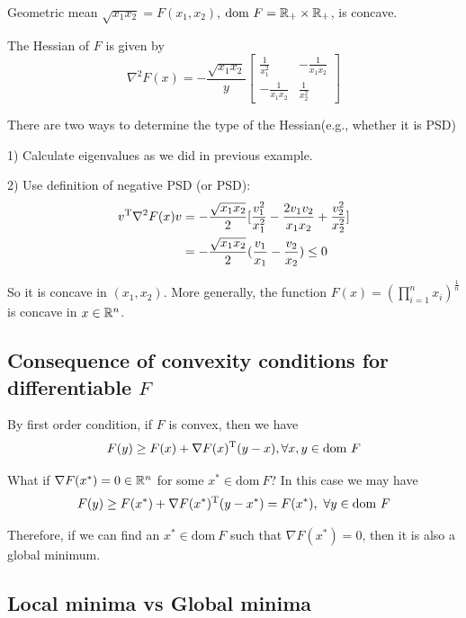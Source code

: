 \begin{example}
	Geometric mean $\sqrt{x_1x_2} = F(x_1,x_2)$, $\text{dom}\ F = \mathbb{R}_+ \times \mathbb{R}_+$, is concave. 
	
	The Hessian of $F$ is given by
	\begin{equation*}
	\nabla^2F(x) = -\frac{\sqrt{x_1x_2}}{y}\begin{bmatrix}
	\frac{1}{x^2_1} & -\frac{1}{x_1x_2}\\
	-\frac{1}{x_1x_2} & \frac{1}{x^2_2}
	\end{bmatrix}
	\end{equation*}
	
	There are two ways to determine the type of the Hessian(e.g., whether it is PSD)
	
	1) Calculate eigenvalues as we did in previous example.
	
	2) Use definition of negative PSD (or PSD):
	\begin{align*}
	v^{{\rm T}}\nabla^2F(x)v &= -\frac{\sqrt{x_1x_2}}{2}[\frac{v_1^2}{x_1^2} - \frac{2v_1v_2}{x_1x_2} + \frac{v_2^2}{x^2_2}]\\
	&= -\frac{\sqrt{x_1x_2}}{2}(\frac{v_1}{x_1} -\frac{v_2}{x_2}) \leq 0
	\end{align*}
	
	So it is concave in $(x_1, x_2)$. More generally, the function $F(x) = (\prod^n_{i=1}x_i)^{\frac{1}{n}}$ is concave in $x\in \mathbb{R}^n$.
\end{example}

\subsection{Consequence of convexity conditions for differentiable $F$}

\quad By first order condition, if $F$ is convex, then we have
$$F(y)\geq F(x) + \nabla F(x)^{{\rm T}}(y-x), \forall x,y\in \text{dom}\ F$$

What if $\nabla F(x^*) = 0 \in \mathbb{R}^n$ for some $x^*\in \text{dom}\ F$? In this case we may have
$$F(y)\geq F(x^*) + \nabla F(x^*)^{\trans}(y-x^*)=F(x^*),\ \forall y\in \text{dom}\ F$$

Therefore, if we can find an $x^*\in \text{dom}\ F$ such that $\nabla F(x^*) = 0$, then it is also a global minimum.





\subsection{Local minima vs Global minima}

